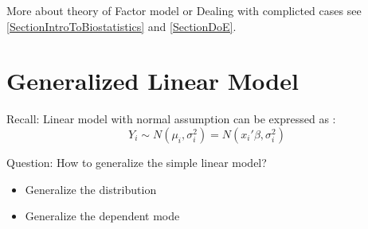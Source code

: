     More about theory of Factor model or Dealing with complicted cases see \autoref{SectionIntroToBiostatistics} and \autoref{SectionDoE}.
    

    
    

        

    


\section{Generalized Linear Model}\label{SubSectionGeneralizedLinearModel}
    Recall: Linear model with normal assumption can be expressed as :
    \begin{equation}
        Y_i\sim N(\mu _i,\sigma_i ^2)=N(x_i'\beta ,\sigma_i ^2) 
    \end{equation}
    
    Question: How to generalize the simple linear model?
\begin{itemize}[topsep=2pt,itemsep=0pt]
    \item Generalize the distribution
    \item Generalize the dependent mode
\end{itemize}


